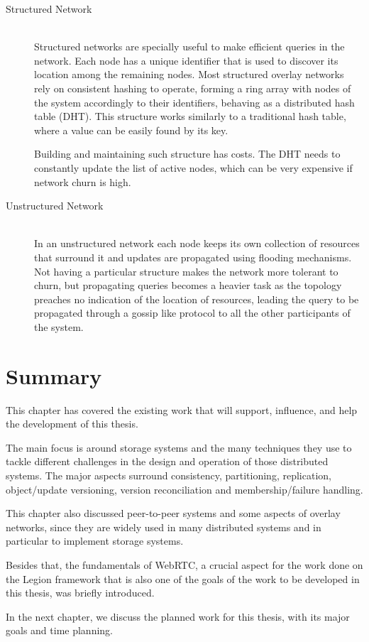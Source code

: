 \begin{description}
\item[Structured Network] \hfill \\
Structured networks are specially useful to make efficient queries in the network. Each node has a unique identifier that is used to discover its location among the remaining nodes. Most structured overlay networks rely on consistent hashing to operate, forming a ring array with nodes of the system accordingly to their identifiers, behaving as a distributed hash table (DHT). This structure works similarly to a traditional hash table, where a value can be easily found by its key.\par
	Building and maintaining such structure has costs. The DHT needs to constantly update the list of active nodes, which can be very expensive if network churn is high.

\item[Unstructured Network] \hfill \\
In an unstructured network each node keeps its own collection of resources that surround it and updates are propagated using flooding mechanisms. Not having a particular structure makes the network more tolerant to churn, but propagating queries becomes a heavier task as the topology preaches no indication of the location of resources, leading the query to be propagated through a gossip like protocol to all the other participants of the system.
\end{description}
	
	

\section{Summary}
\label{sec:summary}
This chapter has covered the existing work that will support, influence, and help the development of this thesis.\par
	The main focus is around storage systems and the many techniques they use to tackle different challenges in the design and operation of those distributed systems. The major aspects surround consistency, partitioning, replication, object/update versioning, version reconciliation and membership/failure handling.\par
	This chapter also discussed peer-to-peer systems and some aspects of overlay networks, since they are widely used in many distributed systems and in particular to implement storage systems.\par
	Besides that, the fundamentals of WebRTC, a crucial aspect for the work done on the Legion framework that is also one of the goals of the work to be developed in this thesis, was briefly introduced.\par
	In the next chapter, we discuss the planned work for this thesis, with its major goals and time planning.